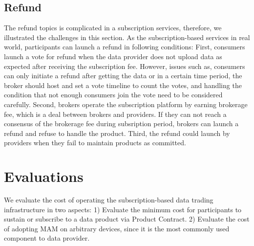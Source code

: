 \documentclass[conference]{IEEEtran}
\begin{document}
\subsection{Refund}
\label{section:refund}
The refund topics is complicated in a subscription services, therefore, we illustrated the challenges in this section. As the subscription-based services in real world, participants can launch a refund in following conditions: First, consumers launch a vote for refund when the data provider does not upload data as expected after receiving the subscription fee. However, issues such as, consumers can only initiate a refund after getting the data or in a certain time period, the broker should host and set a vote timeline to count the votes, and handling the condition that not enough consumers join the vote need to be considered carefully. Second, brokers operate the subscription platform by earning brokerage fee, which is a deal between brokers and providers. If they can not reach a consensus of the brokerage fee during subsription period, brokers can launch a refund and refuse to handle the product. Third, the refund could launch by providers when they fail to maintain products as committed.

\section{Evaluations}
\label{section:evaluation}
We evaluate the cost of operating the subscription-based data trading infrastructure in two aspects: 1) Evaluate the minimum cost for participants to sustain or subscribe to a data product via Product Contract. 2) Evaluate the cost of adopting MAM on arbitrary devices, since it is the most commonly used component to data provider.
\end{document}
